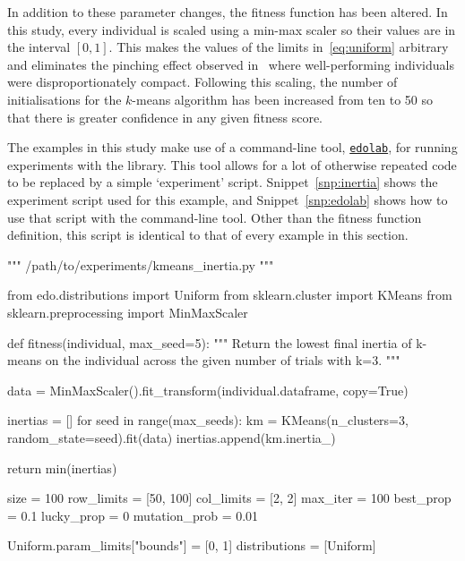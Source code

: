 In addition to these parameter changes, the fitness function has been altered.
In this study, every individual is scaled using a min-max scaler so their values
are in the interval \(\left[0, 1\right]\). This makes the values of the limits
in~\eqref{eq:uniform} arbitrary and eliminates the pinching effect observed
in~\cite{Wilde2020:edo} where well-performing individuals were
disproportionately compact. Following this scaling, the number of
initialisations for the \(k\)-means algorithm has been increased from ten to 50
so that there is greater confidence in any given fitness score.

The examples in this study make use of a command-line tool,
\href{https://github.com/daffidwilde/edolab}{\texttt{edolab}}, for
running experiments with the library. This tool allows for a lot of otherwise
repeated code to be replaced by a simple `experiment' script.
Snippet~\ref{snp:inertia} shows the experiment script used for this example, and
Snippet~\ref{snp:edolab} shows how to use that script with the command-line
tool. Other than the fitness function definition, this script is identical to
that of every example in this section.

\begin{listing}
\begin{sourcepy}
""" /path/to/experiments/kmeans_inertia.py """

from edo.distributions import Uniform
from sklearn.cluster import KMeans
from sklearn.preprocessing import MinMaxScaler


def fitness(individual, max_seed=5):
    """ Return the lowest final inertia of k-means on the individual
    across the given number of trials with k=3. """

    data = MinMaxScaler().fit_transform(individual.dataframe, copy=True)

    inertias = []
    for seed in range(max_seeds):
        km = KMeans(n_clusters=3, random_state=seed).fit(data)
        inertias.append(km.inertia_)

    return min(inertias)


size = 100
row_limits = [50, 100]
col_limits = [2, 2]
max_iter = 100
best_prop = 0.1
lucky_prop = 0
mutation_prob = 0.01

Uniform.param_limits["bounds"] = [0, 1]
distributions = [Uniform]
\end{sourcepy}
\caption{%
    An abridged version of the experiment configuration script used in the first
    example
}\label{snp:inertia}
\end{listing}

